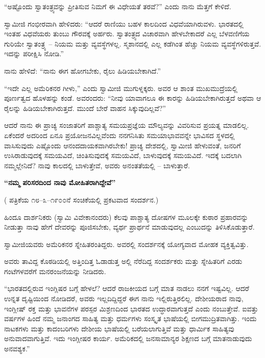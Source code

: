 “ಅಷ್ಟೊಂದು ಸ್ವಾತಂತ್ರ್ಯವನ್ನು ಪ್ರೀತಿಸುವ ನಿಮಗೆ ಈ ವಿಧೇಯತೆ ತರವೆ?” ಎಂದು ನಾನು ಮೆತ್ತಗೆ ಕೇಳಿದೆ.

ಸ್ವಾಮೀಜಿ ಗಂಭೀರವಾಗಿ ಹೇಳಿದರು: “ಆದರೆ ರಾಣಿಯು ಬಹಳ ಕಾಲದಿಂದ ವಿಧವೆಯಾಗಿರುವಳು. ಭಾರತದಲ್ಲಿ ಇಂತಹ ವಿಧವೆಯರು ತುಂಬು ಗೌರವಕ್ಕೆ ಅರ್ಹರು. ಸ್ವಾತಂತ್ರ್ಯದ ವಿಚಾರವಾಗಿ ಹೇಳಬೇಕಾದರೆ ಎಲ್ಲ ಬೆಳವಣಿಗೆಯ ಗುರಿಯೇ ಸ್ವಾತಂತ್ರ್ಯ – ನಿಯಮ ಮತ್ತು ವ್ಯವಸ್ಥೆಗಳಲ್ಲ. ಸ್ಮಶಾನದಲ್ಲಿ ಎಲ್ಲ ಕಡೆಗಿಂತ ಹೆಚ್ಚು ನಿಯಮ ವ್ಯವಸ್ಥೆಗಳಿರುತ್ತವೆ. ಇದನ್ನು ಪರೀಕ್ಷಿಸಿ ನೋಡಿ.”

ನಾನು ಹೇಳಿದೆ: “ನಾನು ಈಗ ಹೋಗಬೇಕು, ರೈಲು ಹಿಡಿಯಬೇಕಾಗಿದೆ.”

“ಇದೇ ಎಲ್ಲ ಅಮೆರಿಕನರ ಗೀಳು,” ಎಂದು ಸ್ವಾಮೀಜಿ ಮುಗುಳ್ನಕ್ಕರು. ಅವರ ಆ ಶಾಂತ ಮುಖಮುದ್ರೆಯಲ್ಲಿ ಪೂರ್ಣತ್ವದ ಹೊಳಹನ್ನು ಕಂಡೆ. ಅವರಂದರು: “ನೀವು ಯಾವಾಗಲೂ ಈ ಕಾರನ್ನು ಹಿಡಿಯಬೇಕಾಗಿರುತ್ತದೆ ಅಥವಾ ಆ ರೈಲನ್ನು ಹಿಡಿಯಬೇಕಾಗಿರುತ್ತದೆ. ಮುಂದೆ ಬೇರೆ ವಾಹನ ಸಿಕ್ಕುವುದಿಲ್ಲವೆ?”

ಆದರೆ ನಾನು ಈ ಪ್ರಾಚ್ಯ ಸಂಜಾತರಿಗೆ ಪಾಶ್ಚಾತ್ಯ ಸಮಯಪ್ರಜ್ಞೆಯ ಮೌಲ್ಯವನ್ನು ವಿವರಿಸುವ ಪ್ರಯತ್ನ ಮಾಡಲಿಲ್ಲ. ಏಕೆಂದರೆ ಅದರಿಂದ ಏನೂ ಪ್ರಯೋಜನವಿಲ್ಲವೆಂದು ನನಗನಿಸಿತು  ಸಮಯಾಭಾವವನ್ನೇ ಭಾವಿಸದ ಸ್ಥಳದಲ್ಲಿ ವಾಸಿಸುವುದು ಎಷ್ಟೊಂದು ಆನಂದದಾಯಕವಾಗಿರಬೇಕು! ಪ್ರಾಚ್ಯ ದೇಶದಲ್ಲಿ, ಸ್ವಾಮೀಜಿ ಹೇಳುವಂತೆ, ಜನರಿಗೆ ಉಸಿರಾಡುವುದಕ್ಕೆ ಸಮಯವಿದೆ, ಚಿಂತಿಸುವುದಕ್ಕೆ ಸಮಯವಿದೆ, ಬಾಳುವುದಕ್ಕೆ ಸಮಯವಿದೆ. ಇದಕ್ಕೆ ಬದಲಾಗಿ ನಮ್ಮಲ್ಲೇನಿದೆ? ನಾವು ಕಾಲದಲ್ಲಿ ಬಾಳುತ್ತೇವೆ, ಅವರು ಅನಂತತೆಯಲ್ಲಿ – ಬಾಳುತ್ತಾರೆ.

\begin{center}
\textbf{“ನಮ್ಮ ಪರಿಸರದಿಂದ ನಾವು ಮೋಹಿತರಾಗಿದ್ದೇವೆ”}
\end{center}

( ಪತ್ರಿಕೆಯ ೧೮–೩–೧೯೦೦ನೆ ಸಂಚಿಕೆಯಲ್ಲಿ ಪ್ರಕಟವಾದ ಸಂದರ್ಶನ.)

ಹಿಂದೂ ದಾರ್ಶನಿಕರು (ಸ್ವಾಮಿ ವಿವೇಕಾನಂದರು) ಕೆಲವು ಪಾಶ್ಚಾತ್ಯ ದೋಷಗಳ ಮೂಲಕ್ಕೇ ಕುಠಾರ ಪ್ರಹಾರವನ್ನು ನೀಡುತ್ತಾ ನಾವು ಹೇಗೆ ದೇವರನ್ನು ಪೂಜಿಸಬೇಕು, ವ್ಯರ್ಥ ಪ್ರಾರ್ಥನೆ ಮಾಡುವುದಲ್ಲ ಎಂಬುದನ್ನು ತಿಳಿಸಿಕೊಡುತ್ತಾರೆ.

ಸ್ವಾಮೀಜಿಯವರು ಅಮೆರಿಕನರ ಸ್ನೇಹಿತರಂತಿದ್ದರು. ಅವರಲ್ಲಿ ಸಂದರ್ಶನಕ್ಕೆ ಯೋಗ್ಯವಾದ ಮೋಹಕ ವ್ಯಕ್ತಿತ್ವವಿತ್ತು.

ಅವರು ತಾವಿದ್ದ ಕೊಠಡಿಯಲ್ಲಿ ಅತ್ತಿಂದಿತ್ತ ಓಡಾಡುತ್ತ ಅಲ್ಲಿ ನೆರೆದಿದ್ದ ಸಂದರ್ಶಕರು ಮತ್ತು ಸ್ನೇಹಿತರಿಗೆ ಎರಡು ಗಂಟೆಗಳವರೆಗೆ ಮನರಂಜನೆಯನ್ನು ನೀಡಿದರು.

“ಭಾರತದಲ್ಲಿರುವ ಇಂಗ್ಲಿಷರ ಬಗ್ಗೆ ಹೇಳಲೆ? ಆದರೆ ರಾಜಕೀಯದ ಬಗ್ಗೆ ಮಾತ ನಾಡಲು ನನಗೆ ಇಷ್ಟವಿಲ್ಲ. ಆದರೆ ಉನ್ನತ ದೃಷ್ಟಿಯಿಂದ ನೋಡಿದರೆ, ಅವರು ಇಲ್ಲದಿದ್ದಿದ್ದರೆ ಈಗ ನಾನು ಇಲ್ಲಿರುತ್ತಿರಲಿಲ್ಲ. ದೇಶೀಯರಾದ ನಾವು, ಇಂಗ್ಲೀಷ್ ರಕ್ತ ಮತ್ತು ಭಾವನೆಗಳ ಪರಸ್ಪರ ಮಿಶ್ರಣದಿಂದ ಭಾರತದ ಉದ್ಧಾರವಾಗುತ್ತದೆ ಎಂದು ನಂಬುತ್ತೇವೆ. ಐವತ್ತು ವರ್ಷಗಳ ಹಿಂದೆ ನಮ್ಮ ಜನಾಂಗದ ಸಾಹಿತ್ಯ ಮತ್ತು ಧರ್ಮಗಳು ಸಂಸ್ಕೃತ ಭಾಷೆಯಲ್ಲಿ ಬೀಗಮುದ್ರಿತವಾಗಿತ್ತು. ಇಂದು ನಾಟಕಗಳು ಮತ್ತು ಕಾದಂಬರಿಗಳು ದೇಶೀಯ ಭಾಷೆಯಲ್ಲಿ ಬರೆಯಲಾಗುತ್ತಿವೆ ಮತ್ತು ಧಾರ್ಮಿಕ ಸಾಹಿತ್ಯವು ಅನುವಾದವಾಗುತ್ತಿವೆ. ಇದು ಇಂಗ್ಲೀಷರ ಕಾರ್ಯ. ಅಮೆರಿಕದಲ್ಲಿ ಜನಸಾಮಾನ್ಯರ ಶಿಕ್ಷಣದ ಬಗ್ಗೆ ಮಾತನಾಡುವುದು ಅನವಶ್ಯಕ.”

